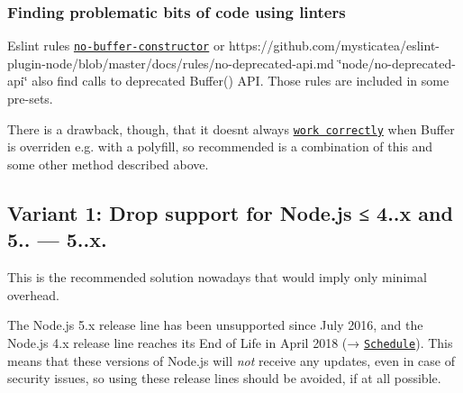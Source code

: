 

\subsubsection*{Finding problematic bits of code using linters}

Eslint rules \href{https://eslint.org/docs/rules/no-buffer-constructor}{\tt no-\/buffer-\/constructor} or https\+://github.com/mysticatea/eslint-\/plugin-\/node/blob/master/docs/rules/no-\/deprecated-\/api.\+md \char`\"{}node/no-\/deprecated-\/api\char`\"{} also find calls to deprecated {\ttfamily Buffer()} A\+PI. Those rules are included in some pre-\/sets.

There is a drawback, though, that it doesn\textquotesingle{}t always \href{https://github.com/chalker/safer-buffer#why-not-safe-buffer}{\tt work correctly} when {\ttfamily Buffer} is overriden e.\+g. with a polyfill, so recommended is a combination of this and some other method described above.

\subsection*{Variant 1\+: Drop support for Node.\+js ≤ 4..\+x and 5.. — 5..\+x.}

This is the recommended solution nowadays that would imply only minimal overhead.

The Node.\+js 5.\+x release line has been unsupported since July 2016, and the Node.\+js 4.\+x release line reaches its End of Life in April 2018 (→ \href{https://github.com/nodejs/Release#release-schedule}{\tt Schedule}). This means that these versions of Node.\+js will {\itshape not} receive any updates, even in case of security issues, so using these release lines should be avoided, if at all possible.

